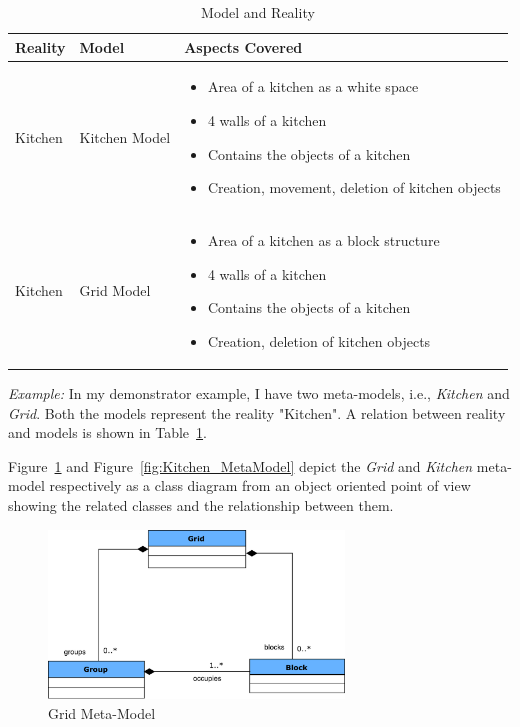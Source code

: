 \begin{table}
	\centering	
	\begin{tabular}{|p{3cm}|p{3cm}|p{8cm}|}
		\hline
		\rowcolor[gray]{.8}	
		\textbf{Reality} & \textbf{Model} & \textbf{Aspects Covered} \\
		\hline
		Kitchen & Kitchen Model & 
		\begin{itemize}
			\item Area of a kitchen as a white space
			\item 4 walls of a kitchen
			\item Contains the objects of a kitchen
			\item Creation, movement, deletion of kitchen objects
		\end{itemize}\\
		\hline
		Kitchen & Grid Model & 
		\begin{itemize}
			\item Area of a kitchen as a block structure
			\item 4 walls of a kitchen
			\item Contains the objects of a kitchen
			\item Creation, deletion of kitchen objects
		\end{itemize}\\
		\hline					
		
	\end{tabular}
	\caption{Model and Reality}
	\label{tab:Model_Reality}
\end{table}

\textit{Example:} In my demonstrator example, I have two meta-models, i.e., \textit{Kitchen} and \textit{Grid}. Both the models represent the reality "Kitchen". A relation between reality and models is shown in Table~\ref{tab:Model_Reality}. 

Figure~\ref{fig:Grid_MetaModel} and Figure~\ref{fig:Kitchen_MetaModel} depict the \textit{Grid} and \textit{Kitchen} meta-model respectively as a class diagram from an object oriented point of view showing the related classes and the relationship between them.

\begin{figure}[h]
	\centering
	\includegraphics[width=0.7\textwidth]{figures/Grid_MetaModel}
	\caption{Grid Meta-Model}
	\label{fig:Grid_MetaModel}
\end{figure}

